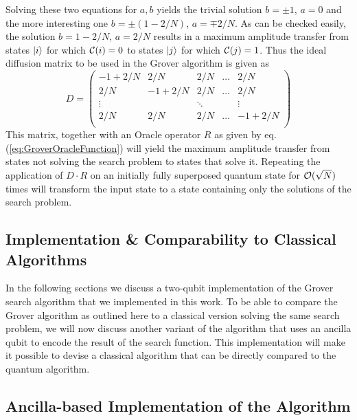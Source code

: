%
Solving these two equations for $a,b$ yields the trivial solution $b = \pm 1$, $a = 0$ and the more interesting one $b = \pm(1-2/N)$, $a=\mp 2/N$. As can be checked easily, the solution $b = 1-2/N$, $a = 2/N$ results in a maximum amplitude transfer from states $\left| i \right>$ for which $\Or(i)=0$ to states $\left| j \right>$ for which $\Or(j)=1$. Thus the ideal diffusion matrix to be used in the Grover algorithm is given as
%
\begin{equation}
D = \left( \begin{array}{ccccc}
	-1+2/N & 2/N & 2/N & \hdots & 2/N \\
	2/N & -1 + 2/N & 2/N & \hdots & 2/N \\
	\vdots & & \ddots &  & \vdots \\
	2/N & 2/N & 2/N & \hdots & -1 + 2/N \\ 
	\end{array} \right) \label{eq:GroverDiffusionOperator}
\end{equation}
%
This matrix, together with an Oracle operator $R$ as given by eq. (\ref{eq:GroverOracleFunction}) will yield the maximum amplitude transfer from states not solving the search problem to states that solve it. Repeating the application of $D\cdot R$ on an initially fully superposed quantum state for $\begin{mathcal}O\end{mathcal}(\sqrt{N})$ times will transform the input state to a state containing only the solutions of the search problem.

\subsection{Implementation \& Comparability to Classical Algorithms}

In the following sections we discuss a two-qubit implementation of the Grover search algorithm that we implemented in this work. To be able to compare the Grover algorithm as outlined here to a classical version solving the same search problem, we will now discuss another variant of the algorithm that uses an ancilla qubit to encode the result of the search function. This implementation will make it possible to devise a classical algorithm that can be directly compared to the quantum algorithm. 

\subsection{Ancilla-based Implementation of the Algorithm}

